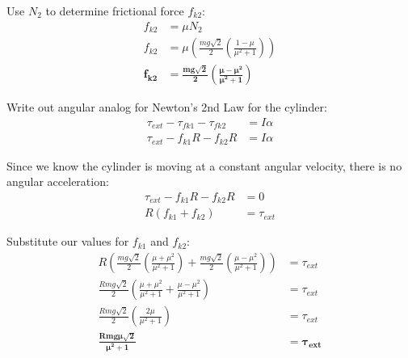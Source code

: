 \documentclass{article}
\begin{document}
Use $N_{2}$ to determine frictional force $f_{k2}$:
\begin{align*}
    f_{k2}&=\mu N_{2}\\
    f_{k2}&=\mu \left(\frac{mg\sqrt{2}}{2}\left(\frac{1-\mu}{\mu^{2}+1}\right)\right)\\
    \bm{f_{k2}}&\bm{=\frac{mg\sqrt{2}}{2}\left(\frac{\mu-\mu^{2}}{\mu^{2}+1}\right)}
\end{align*}

Write out angular analog for Newton's 2nd Law for the cylinder:
\begin{align*}
    \tau_{ext}-\tau_{fk1}-\tau_{fk2}&=I\alpha\\
    \tau_{ext}-f_{k1}R-f_{k2}R&=I\alpha
\end{align*}

Since we know the cylinder is moving at a constant angular velocity, there is no
angular acceleration:
\begin{align*}
    \tau_{ext}-f_{k1}R-f_{k2}R&=0\\
    R\left(f_{k1}+f_{k2}\right)&=\tau_{ext}
\end{align*}

Substitute our values for $f_{k1}$ and $f_{k2}$:
\begin{align*}
    R\left(\frac{mg\sqrt{2}}{2}\left(\frac{\mu+\mu^{2}}{\mu^{2}+1}\right)+\frac{mg\sqrt{2}}{2}\left(\frac{\mu-\mu^{2}}{\mu^{2}+1}\right)\right)&=\tau_{ext}\\
    \frac{Rmg\sqrt{2}}{2}\left(\frac{\mu+\mu^{2}}{\mu^{2}+1}+\frac{\mu-\mu^{2}}{\mu^{2}+1}\right)&=\tau_{ext}\\
    \frac{Rmg\sqrt{2}}{2}\left(\frac{2\mu}{\mu^{2}+1}\right)&=\tau_{ext}\\
    \bm{\frac{Rmg\mu\sqrt{2}}{\mu^{2}+1}}&\bm{=\tau_{ext}}
\end{align*}
\end{document}
